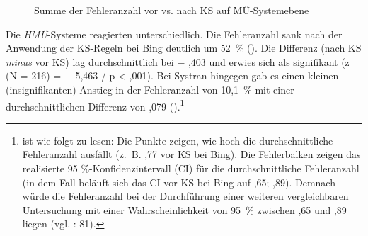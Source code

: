 \begin{figure}









\caption{\label{fig:05:137}Summe der Fehleranzahl vor vs. nach KS auf MÜ-Systemebene   }
\end{figure}

Die \textit{HMÜ}{}-Systeme reagierten unterschiedlich. Die Fehleranzahl sank nach der Anwendung der KS-Regeln bei Bing deutlich um 52~\% (). Die Differenz (nach KS \textit{minus} vor KS) lag durchschnittlich bei $-$ ,403 und erwies sich als signifikant (z (N = 216) = $-$ 5,463 / p < ,001). Bei Systran hingegen gab es einen kleinen (insignifikanten) Anstieg in der Fehleranzahl von 10,1~\% mit einer durchschnittlichen Differenz von ,079 ().\footnote{ ist wie folgt zu lesen: Die Punkte zeigen, wie hoch die durchschnittliche Fehleranzahl ausfällt (z.~B. ,77 vor KS bei Bing). Die Fehlerbalken zeigen das realisierte 95 \%-Konfidenzintervall (CI) für die durchschnittliche Fehleranzahl (in dem Fall beläuft sich das CI vor KS bei Bing auf ,65; ,89). Demnach würde die Fehleranzahl bei der Durchführung einer weiteren vergleichbaren Untersuchung mit einer Wahrscheinlichkeit von 95~\% zwischen ,65 und ,89 liegen (vgl. \citealt{Eckstein2008}: 81).}


